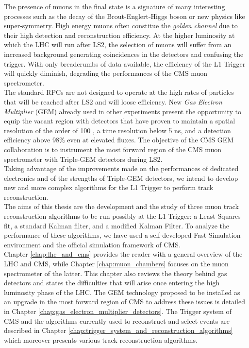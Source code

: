 	The presence of muons in the final state is a signature of many interesting processes such as the decay of the Brout-Englert-Higgs boson or new physics like super-symmetry. High energy muons often constitue the \emph{golden channel} due to their high detection and reconstruction efficiency. At the higher luminosity at which the LHC will run after LS2, the selection of muons will suffer from an increased background generating coincidences in the detectors and confusing the trigger. With only breadcrumbs of data available, the efficiency of the L1 Trigger will quickly diminish, degrading the performances of the CMS muon spectrometer. \\

	The standard RPCs are not designed to operate at the high rates of particles that will be reached after LS2 and will loose efficiency. New \emph{Gas Electron Multiplier} (GEM) already used in other experiments present the opportunity to equip the vacant region with detectors that have proven to maintain a spatial resolution of the order of 100 \um{}, a time resolution below 5 ns, and a detection efficiency above 98\% even at elevated fluxes. The objective of the CMS GEM collaboration is to instrument the most forward region of the CMS muon spectrometer with Triple-GEM detectors during LS2. \\

	Taking advantage of the improvements made on the performances of dedicated electronics and of the strengths of Triple-GEM detectors, we intend to develop new and more complex algorithms for the L1 Trigger to perform track reconstruction. \\

	The aims of this thesis are the development and the study of three muon track reconstruction algorithms to be run possibly at the L1 Trigger: a Least Squares fit, a standard Kalman filter, and a modified Kalman Filter. To analyze the performance of these algorithms, we have used a self-developed Fast Simulation environment and the official simulation framework of CMS. \\

	Chapter \ref{chap:lhc_and_cms} provides the reader with a general overview of the LHC and CMS, while Chapter \ref{chap:muon_chambers} focuses on the muon spectrometer of the latter. This chapter also reviews the theory behind gas detectors and states the difficulties that will arise once entering the high luminosity phase of the LHC. The GEM technology proposed to be installed as an upgrade in the most forward region of CMS to address these issues is detailed in Chapter \ref{chap:gas_electron_multiplier_detectors}. The Trigger system of CMS and the algorithms currently used to reconstruct and select events are described in Chapter \ref{chap:trigger_system_and_reconstruction_algorithms} which moreover presents various track reconstruction algorithms. \\

